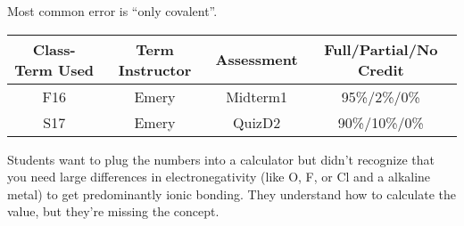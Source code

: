 \begin{outcomes}
Most common error is ``only covalent''.
	\begin{center}
		\begin{tabular}{cccc}
			\hline\hline
		Class-Term Used & Term Instructor & Assessment & Full/Partial/No Credit \\
		\hline
			F16 & Emery & Midterm1 & 95\%/2\%/0\%\\
			S17 & Emery & QuizD2 & 90\%/10\%/0\%\\
			\hline
		\end{tabular}
	\end{center}
\end{outcomes}

\begin{comments}

Students want to plug the numbers into a calculator but didn't recognize that you need large differences in electronegativity (like O, F, or Cl and a alkaline metal) to get predominantly ionic bonding. They understand how to calculate the value, but they're missing the concept.
	
\end{comments}

